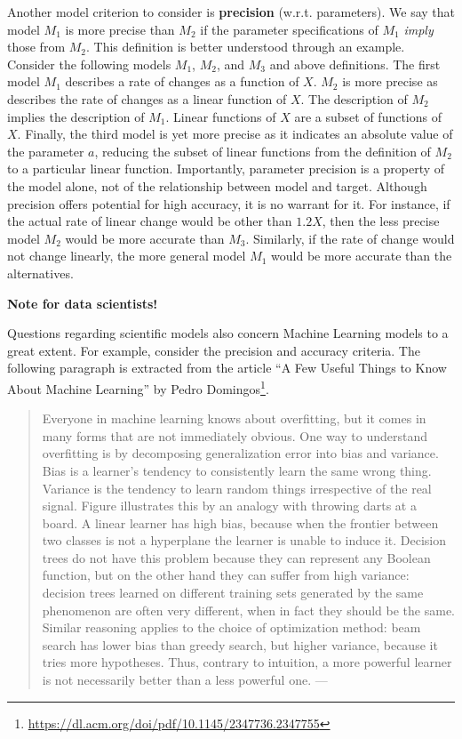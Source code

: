 \documentclass[
  12pt,
]{book}
\DeclareRobustCommand{\href}[2]{#2\footnote{\url{#1}}}
\begin{document}
Another model criterion to consider is \textbf{precision} (w.r.t. parameters). We say that model \(M_1\) is more precise than \(M_2\) if the parameter specifications of \(M_1\) \emph{imply} those from \(M_2\). This definition is better understood through an example. Consider the following models \(M_1\), \(M_2\), and \(M_3\) and above definitions. The first model \(M_1\) describes a rate of changes as a function of \(X\). \(M_2\) is more precise as describes the rate of changes as a linear function of \(X\). The description of \(M_2\) implies the description of \(M_1\). Linear functions of \(X\) are a subset of functions of \(X\). Finally, the third model is yet more precise as it indicates an absolute value of the parameter \(a\), reducing the subset of linear functions from the definition of \(M_2\) to a particular linear function. Importantly, parameter precision is a property of the model alone, not of the relationship between model and target. Although precision offers potential for high accuracy, it is no warrant for it. For instance, if the actual rate of linear change would be other than \(1.2X\), then the less precise model \(M_2\) would be more accurate than \(M_3\). Similarly, if the rate of change would not change linearly, the more general model \(M_1\) would be more accurate than the alternatives.

\begin{tipbox}

\textbf{Note for data scientists!}

Questions regarding scientific models also concern Machine Learning models to a great extent. For example, consider the precision and accuracy criteria. The following paragraph is extracted from \href{https://dl.acm.org/doi/pdf/10.1145/2347736.2347755}{the article ``A Few Useful Things to Know About Machine Learning'' by Pedro Domingos}.

\begin{quote}
Everyone in machine learning knows about overfitting, but it comes in many forms that are not immediately obvious. One way to understand overfitting is by decomposing generalization error into bias and variance. Bias is a learner's tendency to consistently learn the same wrong thing. Variance is the tendency to learn random things irrespective of the real signal. Figure illustrates this by an analogy with throwing darts at a board. A linear learner has high bias, because when the frontier between two classes is not a hyperplane the learner is unable to induce it. Decision trees do not have this problem because they can represent any Boolean function, but on the other hand they can suffer from high variance: decision trees learned on different training sets generated by the same phenomenon are often very different, when in fact they should be the same. Similar reasoning applies to the choice of optimization method: beam search has lower bias than greedy search, but higher variance, because it tries more hypotheses. Thus, contrary to intuition, a more powerful learner is not necessarily better than a less powerful one. --- \citep{domingos2012few}
\end{quote}

\end{tipbox}
\end{document}
